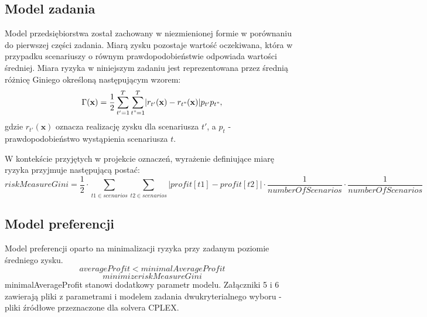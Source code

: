 \documentclass[11pt,a4paper]{article}
\begin{document}
\subsection{Model zadania}
Model przedsiębiorstwa został zachowany w niezmienionej formie w porównaniu do pierwszej części zadania. Miarą zysku pozostaje wartość oczekiwana, która w przypadku scenariuszy o równym prawdopodobieństwie odpowiada wartości średniej. Miara ryzyka w niniejszym zadaniu jest reprezentowana przez średnią różnicę Giniego określoną następującym wzorem:
\begin{equation}
\Gamma(\mathbf{x})=\frac{1}{2}\sum_{t'=1}^{T}\sum_{t"=1}^{T}\lvert r_{t'}(\mathbf{x})-r_{t"}(\mathbf{x})\rvert p_{t'}p_{t"}, 
\end{equation}
gdzie $r_{t'}(\mathbf{x})$ oznacza realizację zysku dla scenariusza $t'$, a $p_{t}$ - prawdopodobieństwo wystąpienia scenariusza $t$.

W kontekście przyjętych w projekcie oznaczeń, wyrażenie definiujące miarę ryzyka przyjmuje następującą postać:
\begin{equation}
riskMeasureGini = \frac{1}{2}\cdot\sum_{t1 \in scenarios}\sum_{t2 \in scenarios} \lvert profit[t1]-profit[t2] \rvert \cdot \frac{1}{numberOfScenarios} \cdot \frac{1}{numberOfScenarios} 
\end{equation}

\subsection{Model preferencji}
Model preferencji oparto na minimalizacji ryzyka przy zadanym poziomie średniego zysku.
\begin{equation}
averageProfit<minimalAverageProfit
\end{equation}
\begin{equation}
minimize riskMeasureGini
\end{equation}
minimalAverageProfit stanowi dodatkowy parametr modelu. Załączniki 5 i 6 zawierają pliki z parametrami i modelem zadania dwukryterialnego wyboru - pliki źródłowe przeznaczone dla solvera CPLEX. 
\end{document}
